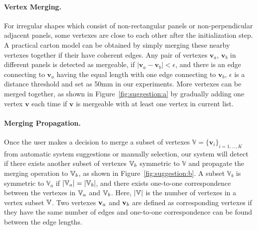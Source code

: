 \paragraph{Vertex Merging.} 
For irregular shapes which consist of non-rectangular panels or non-perpendicular adjacent panels, some vertexes are close to each other after the initialization step.
A practical carton model can be obtained by simply merging these nearby vertexes together if their have coherent edges.
%
Any pair of vertexes $\mathbf{v}_a$, $\mathbf{v}_b$ in different panels is detected as mergeable, if $|\mathbf{v}_a-\mathbf{v}_b|<\epsilon$, and there is an edge connecting to $\mathbf{v}_a$ having the equal length with one edge connecting to $\mathbf{v}_b$,
%
$\epsilon$ is a distance threshold and set as 50mm in our experiments.
More vertexes can be merged together, as shown in Figure~\ref{fig:suggestion:a} by gradually adding one vertex $\mathbf{v}$ each time if $\mathbf{v}$ is mergeable with at least one vertex in current list. 

\paragraph{Merging Propagation.} %
Once the user makes a decision to merge a subset of vertexes $\mathbb{V}=\{\mathbf{v}_i\}_{i=1,\ldots,K}$ from automatic system suggestions or manually selection, our system will detect if there exists another subset of vertexes $\mathbb{V}_b$ symmetric to $\mathbb{V}$ and propagate the merging operation to $\mathbb{V}_b$, as shown in Figure~\ref{fig:suggestion:b}. 
A subset $\mathbb{V}_b$ is symmetric to $\mathbb{V}_a$ if $|\mathbb{V}_a|=|\mathbb{V}_b|$, and there exists one-to-one correspondence between the vertexes in $\mathbb{V}_a$ and $\mathbb{V}_b$. 
Here, $|\mathbb{V}|$ is the number of vertexes in a vertex subset $\mathbb{V}$. 
Two vertexes $\mathbf{v}_a$ and $\mathbf{v}_b$ are defined as corresponding vertexes if they have the same number of edges and one-to-one correspondence can be found between the edge lengths. 

